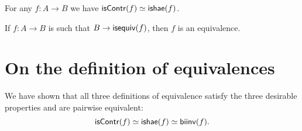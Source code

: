 \documentclass[hott-all.tex]{subfiles}
\begin{document}
\begin{thm}\label{thm:equiv-contr-hae}
  For any $f:A\to B$ we have $\mathsf{isContr}(f) \simeq \mathsf{ishae}(f)$.
\end{thm}
%

\begin{cor}\label{thm:equiv-inhabcod}
  If $f:A\to B$ is such that $B\to \mathsf{isequiv}(f)$, then $f$ is an equivalence.
\end{cor}


\section{On the definition of equivalences}
\label{sec:concluding-remarks}

We have shown that all three definitions of equivalence satisfy the three desirable properties and are pairwise equivalent:
\[ \mathsf{isContr}(f) \simeq \mathsf{ishae}(f) \simeq \mathsf{biinv}(f). \]
%
%
\end{document}
